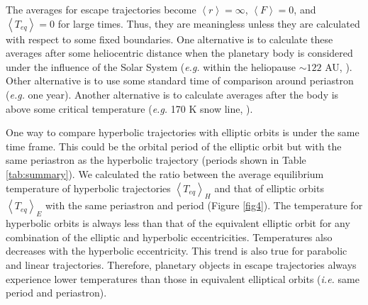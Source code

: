 \documentclass[a4paper,fleqn,usenatbib]{mnras}
\begin{document}

The averages for escape trajectories become $\left<r\right>=\infty$, $\left<F\right>=0$, and $\left<T_{eq}\right>=0$ for large times. Thus, they are meaningless unless they are calculated with respect to some fixed boundaries. One alternative is to calculate these averages after some heliocentric distance when the planetary body is considered under the influence of the Solar System (\emph{e.g.} within the heliopause $\sim122$ AU, \citet{2017ApJ...834..197C}). Other alternative is to use some standard time of comparison around periastron (\emph{e.g.} one year). Another alternative is to calculate averages after the body is above some critical temperature (\emph{e.g.} 170 K snow line, \citet{2008ApJ...673..502K}).


One way to compare hyperbolic trajectories with elliptic orbits is under the same time frame. This could be the orbital period of the elliptic orbit but with the same periastron as the hyperbolic trajectory (periods shown in Table \ref{tab:summary}). We calculated the ratio between the average equilibrium temperature of hyperbolic trajectories $\left<T_{eq}\right>_H$ and that of elliptic orbits $\left<T_{eq}\right>_E$ with the same periastron and period (Figure \ref{fig4}). The temperature for hyperbolic orbits is always less than that of the equivalent elliptic orbit for any combination of the elliptic and hyperbolic eccentricities. Temperatures also decreases with the hyperbolic eccentricity. This trend is also true for parabolic and linear trajectories. Therefore, planetary objects in escape trajectories always experience lower temperatures than those in equivalent elliptical orbits (\emph{i.e.} same period and periastron).

\end{document}
